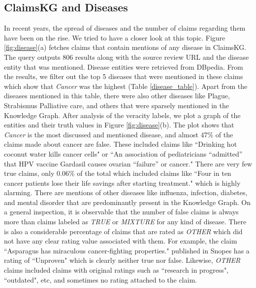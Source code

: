 \documentclass[
]{ceurart}
\begin{document}
\subsection{ClaimsKG and Diseases}
\vspace{-2mm}
In recent years, the spread of diseases and the number of claims regarding them have been on the rise. We tried to have a closer look at this topic. Figure \ref{fig:disease}(a) fetches claims that contain mentions of any disease in ClaimsKG.  The query outputs 806 %
results along with the source review URL and the disease entity that was mentioned. Disease entities were retrieved from DBpedia. From the results, we filter out the top 5 diseases that were mentioned in these claims which show that \textit{Cancer} was the highest (Table \ref{disease_table}). Apart from the diseases mentioned in this table, there were also other diseases like Plague, Strabismus Palliative care, and others that were sparsely mentioned in the Knowledge Graph. After analysis of the veracity labels, we plot a graph of the entities and their truth values in Figure \ref{fig:disease}(b).
The plot shows that \textit{Cancer} is the most discussed and mentioned disease, and almost 47\% of the claims made about cancer are false. These included claims like ``Drinking hot coconut water kills cancer cells" or ``An association of pediatricians ``admitted” that HPV vaccine Gardasil causes ovarian ``failure” or cancer." There are very few true claims, only 0.06\% of the total which included claims like ``Four in ten cancer patients lose their life savings after starting treatment." which is highly alarming. There are mentions of other diseases like influenza, infection, diabetes, and mental disorder that are predominantly present in the Knowledge Graph. On a general inspection, it is observable that the number of false claims is always more than claims labeled as \textit{TRUE} or \textit{MIXTURE} for any kind of disease. There is also a considerable percentage of claims that are rated as \textit{OTHER} which did not have any clear rating value associated with them. For example, the claim ``Asparagus has miraculous cancer-fighting properties." published in Snopes has a rating of ``Unproven" which is clearly neither true nor false. Likewise, \textit{OTHER} claims included claims with original ratings such as ``research in progress", ``outdated", etc, and sometimes no rating attached to the claim.
\vspace{-4mm}
\end{document}
